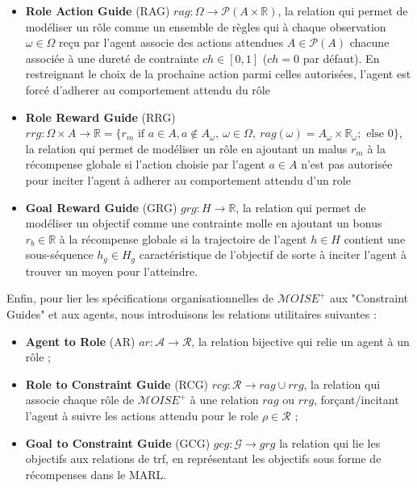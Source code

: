 \documentclass[sigconf,anonymous]{aamas}
\begin{document}
\begin{itemize}[label={},itemjoin={; }]
    \item \textbf{Role Action Guide} (RAG) \quad $rag: \Omega \rightarrow \mathcal{P}(A \times \mathbb{R})$, la relation qui permet de modéliser un rôle comme un ensemble de règles qui à chaque observation $\omega \in \Omega$ reçu par l'agent associe des actions attendues $A \in \mathcal{P}(A)$ chacune associée à une dureté de contrainte $ch \in [0,1]$ ($ch = 0$ par défaut). En restreignant le choix de la prochaine action parmi celles autorisées, l'agent est forcé d'adherer au comportement attendu du rôle
    \item \textbf{Role Reward Guide} (RRG) \quad $rrg: \Omega \times A \to \mathbb{R} = \{r_m \text{ if } a \in A, a \notin A_\omega, \ \omega \in \Omega, \ rag(\omega) = A_\omega \times \mathbb{R_\omega}; \text{ else } 0\}$, la relation qui permet de modéliser un rôle en ajoutant un malus $r_m$ à la récompense globale si l'action choisie par l'agent $a \in A$ n'est pas autorisée pour inciter l'agent à adherer au comportement attendu d'un role
    \item \textbf{Goal Reward Guide} (GRG) \quad $grg: H \rightarrow \mathbb{R}$, la relation qui permet de modéliser un objectif comme une contrainte molle en ajoutant un bonus $r_b \in \mathbb{R}$ à la récompense globale si la trajectoire de l'agent $h \in H$ contient une sous-séquence $h_g \in H_g$ caractéristique de l'objectif de sorte à inciter l'agent à trouver un moyen pour l'atteindre.
\end{itemize}

Enfin, pour lier les spécifications organisationnelles de $\mathcal{M}OISE^+$ aux "Constraint Guides" et aux agents, nous introduisons les relations utilitaires suivantes :
\begin{itemize}
    \item \textbf{Agent to Role} (AR) \quad $ar: \mathcal{A} \to \mathcal{R}$, la relation bijective qui relie un agent à un rôle ;
    \item \textbf{Role to Constraint Guide} (RCG) \quad $rcg: \mathcal{R} \rightarrow rag \cup rrg$, la relation qui associe chaque rôle de $\mathcal{M}OISE^+$ à une relation $rag$ ou $rrg$, forçant/incitant l'agent à suivre les actions attendu pour le role $\rho \in \mathcal{R}$ ;
    \item \textbf{Goal to Constraint Guide} (GCG) \quad $gcg: \mathcal{G} \rightarrow grg$ la relation qui lie les objectifs aux relations de trf, en représentant les objectifs sous forme de récompenses dans le MARL.
\end{itemize}
\end{document}
